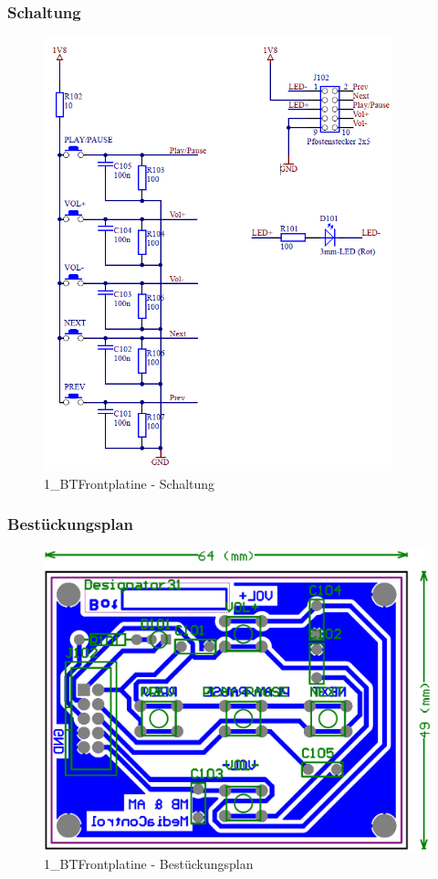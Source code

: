\subsubsection*{Schaltung}
\begin{figure} [H]
	\centering
	\includegraphics[width=0.9\textwidth]{img/BTModul/front_sch.png}
	\caption{1\_BTFrontplatine - Schaltung}
	\label {fig:8.10.4}
\end{figure}

\newpage
\subsubsection*{Bestückungsplan}
\begin{figure} [H]
	\centering
	\includegraphics[width=1\textwidth]{img/BTModul/front_Best.png}
	\caption{1\_BTFrontplatine - Bestückungsplan}
	\label {fig:8.10.5}
\end{figure}
